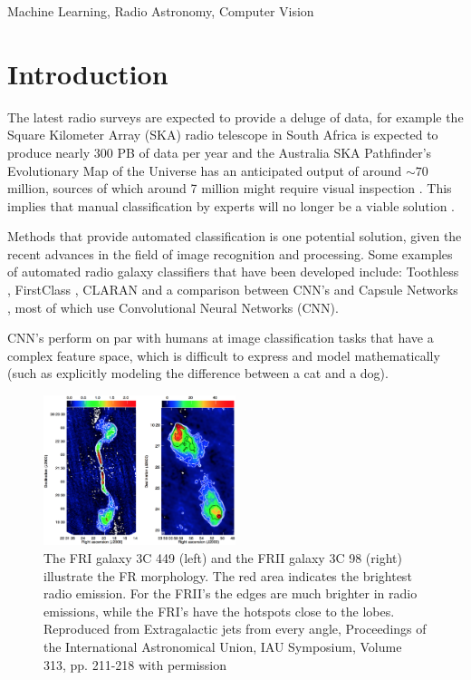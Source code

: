 \documentclass[conference]{IEEEtran}
\begin{document}
\begin{IEEEkeywords}
Machine Learning, Radio Astronomy, Computer Vision 
\end{IEEEkeywords}

\section{Introduction}
The latest radio surveys are expected to provide a deluge of data, for example the Square Kilometer Array (SKA) radio telescope in South Africa is expected to produce nearly 300 PB of data per year \cite{jonas_2018} and the Australia SKA Pathfinder's Evolutionary Map of the Universe has an anticipated output of around $\sim70$ million, sources of which around 7 million might require visual inspection \cite{askap_2008} \cite{emu_2011}. This implies that  manual classification by experts will no longer be a viable solution \cite{hocking_2015}.

Methods that provide automated classification is one potential solution, given the recent advances in the field of image recognition and processing. Some examples of automated radio galaxy classifiers that have been developed include: Toothless \cite{aniyan_thorat_2017}, FirstClass \cite{alhassan_2018}, CLARAN \cite{wu_2019} and a comparison between CNN's and Capsule Networks \cite{lukic_2019}, most of which use Convolutional Neural Networks (CNN).

CNN's perform on par with humans at image classification tasks that have a complex feature space, which is difficult to express and model mathematically (such as explicitly modeling the difference between a cat and a dog). 


\begin{figure}[h]
    \centering
    \includegraphics[width=0.5\textwidth]{EPS/kharb2015.eps}
    \caption{The FRI galaxy 3C 449 (left) and the FRII galaxy 3C 98 (right) illustrate the FR morphology. The red area indicates the brightest radio emission. For the FRII's the edges are much brighter in radio emissions, while the FRI's have the hotspots close to the lobes. Reproduced from Extragalactic jets from every angle, Proceedings of the International Astronomical Union, IAU Symposium, Volume 313, pp. 211-218 with permission \cite{kharb2015}}
    \label{fig:kharb}
\end{figure}
\end{document}
